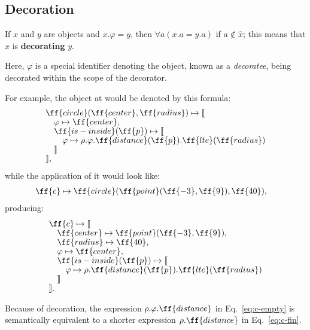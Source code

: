 \subsection{Decoration}\label{sec:decoration}

\begin{eodefinition}\label{def:decorator}
If $x$ and $y$ are objects and $x.\varphi = y$, then
  $\forall a (x.a = y.a)$ if $a \not\in \hat{x}$;
  this means that $x$ is \textbf{decorating} $y$.
\end{eodefinition}

Here, $\varphi$ is a special identifier denoting the object,
known as a \emph{decoratee}, being decorated
within the scope of the decorator.

For example, the object at  would
be denoted by this formula:
\begin{equation}\label{eq:c-empty}
\begin{split}
& \ff{circle}(\ff{center}, \ff{radius}) \mapsto \llbracket \br
& \quad \varphi \mapsto \ff{center}, \br
& \quad \ff{is-inside}(\ff{p}) \mapsto \llbracket \br
& \quad \quad \varphi \mapsto \rho.\varphi.\ff{distance}(\ff{p}).\ff{lte}(\ff{radius}) \br
& \quad \rrbracket \br
& \rrbracket,
\end{split}
\end{equation}
while the application of it would look like:
\begin{equation}
\begin{split}
\ff{c} & \mapsto \ff{circle}(\ff{point}(\ff{-3}, \ff{9}), \ff{40}),
\end{split}
\end{equation}
producing:
\begin{equation}\label{eq:c-fin}
\begin{split}
& \ff{c} \mapsto \llbracket \br
& \quad \ff{center} \mapsto \ff{point}(\ff{-3}, \ff{9}), \br
& \quad \ff{radius} \mapsto \ff{40}, \br
& \quad \varphi \mapsto \ff{center}, \br
& \quad \ff{is-inside}(\ff{p}) \mapsto \llbracket \br
& \quad \quad \varphi \mapsto \rho.\ff{distance}(\ff{p}).\ff{lte}(\ff{radius}) \br
& \quad \rrbracket \br
& \rrbracket.
\end{split}
\end{equation}

Because of decoration, the expression
$\rho.\varphi.\ff{distance}$ in Eq.~\ref{eq:c-empty} is semantically equivalent to a shorter expression
$\rho.\ff{distance}$ in Eq.~\ref{eq:c-fin}.

